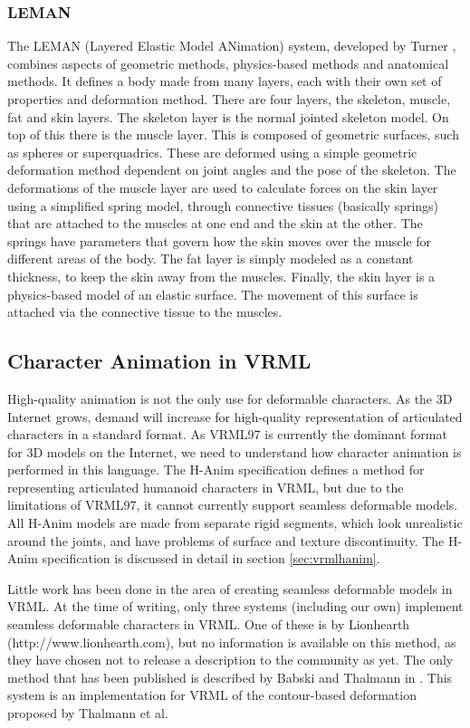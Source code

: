 \documentclass[10pt,oneside,fleqn,a4paper]{book}
\begin{document}
\subsubsection{LEMAN}
The LEMAN (Layered Elastic Model ANimation) system, developed by Turner \cite{Turner93}, combines aspects of geometric methods, physics-based methods and anatomical methods. It defines a body made from many layers, each with their own set of properties and deformation method. There are four layers, the skeleton, muscle, fat and skin layers. The skeleton layer is the normal jointed skeleton model. On top of this there is the muscle layer. This is composed of geometric surfaces, such as spheres or superquadrics. These are deformed using a simple geometric deformation method dependent on joint angles and the pose of the skeleton. The deformations of the muscle layer are used to calculate forces on the skin layer using a simplified spring model, through connective tissues (basically springs) that are attached to the muscles at one end and the skin at the other. The springs have parameters that govern how the skin moves over the muscle for different areas of the body. The fat layer is simply modeled as a constant thickness, to keep the skin away from the muscles. Finally, the skin layer is a physics-based model of an elastic surface. The movement of this surface is attached via the connective tissue to the muscles. 

\subsection{\label{sec:reviewvrml}Character Animation in VRML}
High-quality animation is not the only use for deformable characters. As the 3D Internet grows, demand will increase for high-quality representation of articulated characters in a standard format. As VRML97 \cite{VRML97} is currently the dominant format for 3D models on the Internet, we need to understand how character animation is performed in this language. The H-Anim specification \cite{HANIM99} defines a method for representing articulated humanoid characters in VRML, but due to the limitations of VRML97, it cannot currently support seamless deformable models. All H-Anim models are made from separate rigid segments, which look unrealistic around the joints, and have problems of surface and texture discontinuity. The H-Anim specification is discussed in detail in section \ref{sec:vrmlhanim}.

Little work has been done in the area of creating seamless deformable models in VRML. At the time of writing, only three systems (including our own) implement seamless deformable characters in VRML. One of these is by Lionhearth (http://www.lionhearth.com), but no information is available on this method, as they have chosen not to release a description to the community as yet. The only method that has been published is described by Babski and Thalmann in \cite{Babski99}. This system is an implementation for VRML of the contour-based deformation proposed by Thalmann et al.
\end{document}
